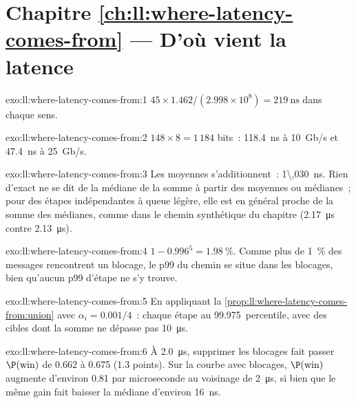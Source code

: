 \section*{Chapitre \ref{ch:ll:where-latency-comes-from} --- D'où vient la latence}

\begin{solution}{exo:ll:where-latency-comes-from:1}
$45 \times 1.462 / (2.998\times10^8) = \qty{219}{\nano\second}$ dans chaque sens.
\end{solution}

\begin{solution}{exo:ll:where-latency-comes-from:2}
$148 \times 8 = 1\,184$ bits~: \qty{118.4}{\nano\second} à 10~Gb/s et \qty{47.4}{\nano\second} à 25~Gb/s.
\end{solution}

\begin{solution}{exo:ll:where-latency-comes-from:3}
Les moyennes s'additionnent~: \qty{1\,030}{\nano\second}. Rien d'exact ne se dit de la médiane de la somme à partir des moyennes ou
médianes~; pour des étapes indépendantes à queue légère, elle est en général proche de la somme des médianes, comme dans le chemin synthétique du chapitre
(\qty{2.17}{\micro\second} contre \qty{2.13}{\micro\second}).
\end{solution}

\begin{solution}{exo:ll:where-latency-comes-from:4}
$1 - 0.996^5 = 1.98~\%$. Comme plus de 1~\% des messages rencontrent un blocage, le p99 du chemin se situe dans les blocages, bien qu'aucun
p99 d'étape ne s'y trouve.
\end{solution}

\begin{solution}{exo:ll:where-latency-comes-from:5}
En appliquant la \cref{prop:ll:where-latency-comes-from:union} avec $\alpha_i = 0.001/4$~: chaque étape au 99.975~percentile, avec
des cibles dont la somme ne dépasse pas \qty{10}{\micro\second}.
\end{solution}

\begin{solution}{exo:ll:where-latency-comes-from:6}
À \qty{2.0}{\micro\second}, supprimer les blocages fait passer $\P(\text{win})$ de 0.662 à 0.675 (1.3 points). Sur la
courbe avec blocages, $\P(\text{win})$ augmente d'environ 0.81 par microseconde au voisinage de \qty{2}{\micro\second}, si bien que le même gain
fait baisser la médiane d'environ \qty{16}{\nano\second}.
\end{solution}

